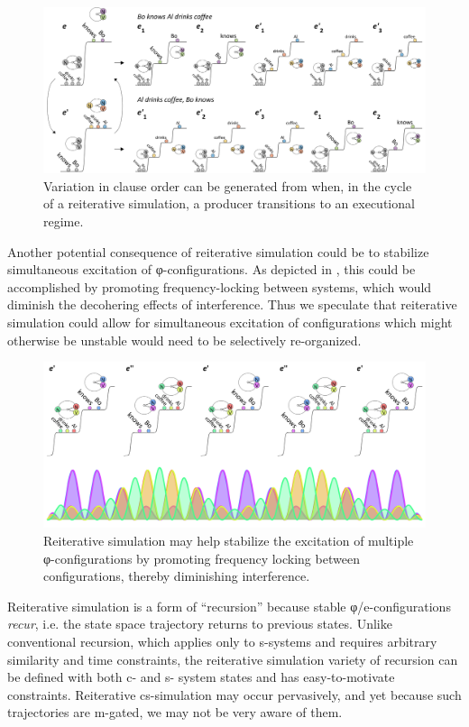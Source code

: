   
\begin{figure}
\includegraphics[width=\textwidth]{figures/Tilsen-img116.png}
\caption{Variation in clause order can be generated from when, in the cycle of a reiterative simulation, a producer transitions to an executional regime.}
\label{fig:5:12}
\end{figure}
 

  Another potential consequence of reiterative simulation could be to stabilize simultaneous excitation of φ-configurations. As depicted in {}, this could be accomplished by promoting frequency-locking between systems, which would diminish the decohering effects of interference. Thus we speculate that reiterative simulation could allow for simultaneous excitation of configurations which might otherwise be unstable would need to be selectively re-organized.

  
\begin{figure}
\includegraphics[width=\textwidth]{figures/Tilsen-img117.png}
\caption{Reiterative simulation may help stabilize the excitation of multiple φ-configurations by promoting frequency locking between configurations, thereby diminishing interference.}
\label{fig:5:13}
\end{figure}
 

  Reiterative simulation is a form of “recursion” because stable φ/e-configurations \textit{recur}, i.e. the state space trajectory returns to previous states. Unlike conventional recursion, which applies only to s-systems and requires arbitrary similarity and time constraints, the reiterative simulation variety of recursion can be defined with both c- and s- system states and has easy-to-motivate constraints. Reiterative cs-simulation may occur pervasively, and yet because such trajectories are m-gated, we may not be very aware of them. 

